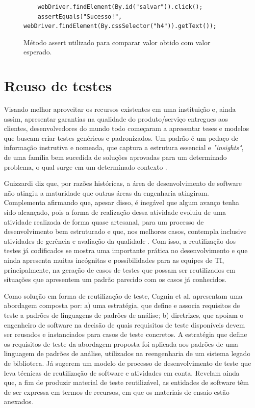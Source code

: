 \documentclass[tg]{mdtufsm}
\begin{document}
\begin{figure}[!htb]
	\begin{lstlisting}
	webDriver.findElement(By.id("salvar")).click();
	assertEquals("Sucesso!", webDriver.findElement(By.cssSelector("h4")).getText());
	\end{lstlisting}
	\caption{Método assert utilizado para comparar valor obtido com valor esperado.}
	\label{code:JUnit assert}
\end{figure}

\section{Reuso de testes}

Visando melhor aproveitar os recursos existentes em uma instituição e, ainda assim, apresentar garantias na qualidade do produto/serviço entregues aos clientes, desenvolvedores do mundo todo começaram a apresentar teses e modelos que buscam criar testes genéricos e padronizados. Um padrão é um pedaço de informação instrutiva e nomeada, que captura a estrutura essencial
e \emph{"insights"}, de uma família bem sucedida de soluções aprovadas para um determinado problema, o qual surge em um determinado contexto \cite{cagnin2004reuso}.

Guizzardi \citeyearpar{guizzardi2000desenvolvimento} diz que, por razões históricas, a área de desenvolvimento de software não atingiu a maturidade que outras áreas da engenharia atingiram. Complementa afirmando que, apesar disso, é inegável que algum avanço tenha sido alcançado, pois a forma de realização dessa atividade evoluiu de uma atividade realizada de forma quase artesanal, para um processo de
desenvolvimento bem estruturado e que, nos melhores casos, contempla inclusive atividades de gerência e avaliação da qualidade \cite{guizzardi2000desenvolvimento}.
Com isso, a reutilização dos testes já codificados se mostra uma importante prática no desenvolvimento e que ainda apresenta muitas incógnitas e possibilidades para as equipes de TI,
principalmente, na geração de casos de testes que possam ser reutilizados em situações que apresentem um padrão parecido com os casos já conhecidos.

Como solução em forma de reutilização de teste, Cagnin et al. \citeyearpar{cagnin2004reuso} apresentam uma abordagem composta por: a) uma estratégia, que define e associa requisitos de teste a padrões de linguagens de padrões  de análise; b) diretrizes, que apoiam o engenheiro de software na decisão de quais requisitos de teste disponíveis devem ser reusados e instanciados para casos de teste concretos. A estratégia que define os requisitos de teste da abordagem proposta foi aplicada aos padrões de uma
linguagem de padrões de análise, utilizados na reengenharia de um sistema legado de biblioteca. Já \cite{karinsalo2004software} sugerem um modelo de processo de desenvolvimento de teste que leva técnicas de reutilização de software e atividades em conta. Revelam ainda que, a fim de produzir material de teste reutilizável, as entidades de software têm de ser expressa em termos de recursos, em que os materiais de ensaio estão anexados.
\end{document}
